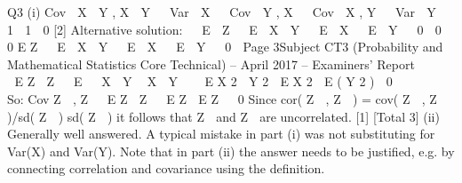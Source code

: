 \documentclass[a4paper,12pt]{article}
\begin{document}

Q3
(i)
Cov  X  Y , X  Y   Var  X   Cov  Y , X   Cov  X , Y   Var  Y   1  1  0
[2]
Alternative solution:
 
E  Z   E  X  Y   E  X   E  Y   0  0  0
E Z   E  X  Y   E  X   E  Y   0

Page 3Subject CT3 (Probability and Mathematical Statistics Core Technical) – April 2017 – Examiners’ Report



  
E Z  Z   E   X  Y  X  Y    E X 2  Y 2  E X 2  E ( Y 2 )  0

 
    
So: Cov Z  , Z   E Z  Z   E Z  E Z   0
Since cor( Z  , Z  ) = cov( Z  , Z  )/{sd( Z  ) sd( Z  )} it follows that Z  and
Z  are uncorrelated.
[1]
[Total 3]
(ii)
Generally well answered. A typical mistake in part (i) was not substituting for
Var(X) and Var(Y). Note that in part (ii) the answer needs to be justified,
e.g. by connecting correlation and covariance using the definition.



\end{document}
